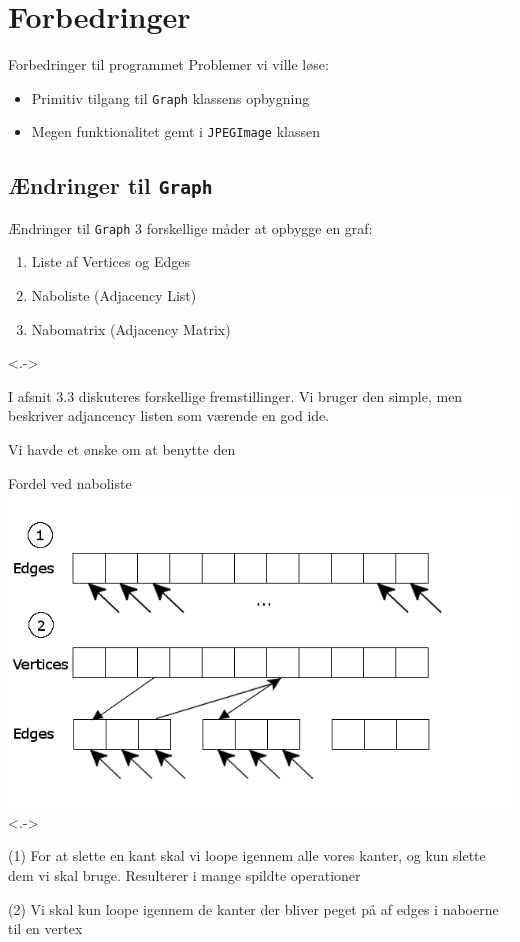 \section{Forbedringer}
\begin{frame}{Forbedringer til programmet}{}
	Problemer vi ville løse:
	\begin{itemize}
		\item Primitiv tilgang til \lstinline|Graph| klassens opbygning
		\item Megen funktionalitet gemt i \lstinline|JPEGImage| klassen
	\end{itemize}
\end{frame}

\subsection{Ændringer til \lstinline|Graph|}
\begin{frame}{Ændringer til \lstinline|Graph|}{}
	3 forskellige måder at opbygge en graf:
	\begin{enumerate}
		\item Liste af Vertices og Edges\uncover<2-2>{\textcolor{red}{$\leftarrow$}}
		\item Naboliste (Adjacency List)\uncover<3-3>{\textcolor{red}{$\leftarrow$}}
		\item Nabomatrix (Adjacency Matrix)
	\end{enumerate}
\note<.-> {
	I afsnit 3.3  diskuteres forskellige fremstillinger. Vi bruger den simple, men beskriver adjancency listen som værende en god ide.

	Vi havde et ønske om at benytte den
}
\end{frame}

\begin{frame}{Fordel ved naboliste}{}
\includegraphics[width=\textwidth]{figures/graphLists.png}
\note<.-> {
	(1)
	For at slette en kant skal vi loope igennem alle vores kanter, og kun slette dem vi skal bruge.
	Resulterer i mange spildte operationer

	(2)
	Vi skal kun loope igennem de kanter der bliver peget på af edges i naboerne til en vertex
}
\end{frame}



